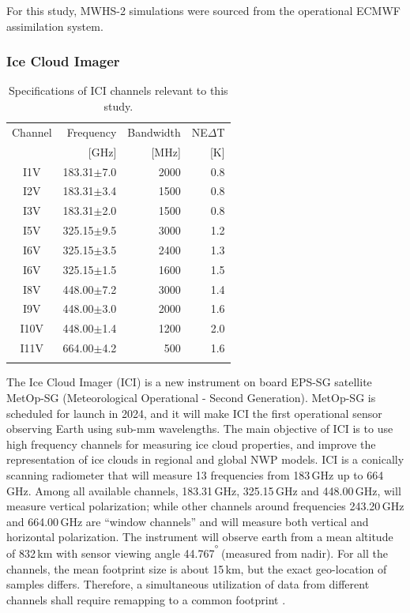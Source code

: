 \documentclass[amt, manuscript]{copernicus}
\begin{document}
For this study, MWHS-2 simulations were sourced from the operational ECMWF assimilation system.

\subsubsection{Ice Cloud Imager}
%
\begin{table}[t]	
	\caption{Specifications of ICI channels relevant to this study.}
	\label{tab:ICI_MWI_channels}
	\begin{tabular}{crrr}
		\tophline
		Channel & Frequency 	& Bandwidth  	&NE$\Delta$T	\\
				& [GHz]			& [MHz]			& [K]			\\
		\middlehline
		I1V&	183.31$\pm$7.0    & 2000 			& 0.8 		\\
		I2V&	183.31$\pm$3.4    & 1500 			& 0.8 		\\
		I3V&	183.31$\pm$2.0    & 1500			& 0.8 		\\
		I5V&	325.15$\pm$9.5    & 3000			& 1.2 		\\
		I6V&	325.15$\pm$3.5    & 2400			& 1.3 		\\
		I6V&	325.15$\pm$1.5    & 1600			& 1.5 		\\
		I8V&	448.00$\pm$7.2    & 3000			& 1.4 		\\
		I9V&	448.00$\pm$3.0    & 2000			& 1.6 		\\
		I10V&	448.00$\pm$1.4    & 1200			& 2.0 		\\
		I11V&	664.00$\pm$4.2    & \phantom{0}500	& 1.6 		\\		
		\bottomhline
	\end{tabular}
	\belowtable{} %
\end{table}

The Ice Cloud Imager (ICI) is a new instrument on board EPS-SG satellite MetOp-SG (Meteorological Operational - Second Generation). MetOp-SG is scheduled for launch in 2024, and it will make ICI the first operational sensor observing Earth using sub-mm wavelengths. The main objective of ICI is to use high frequency channels for measuring ice cloud properties, and improve the representation of ice clouds in regional and global NWP models. ICI is a conically scanning radiometer that will measure 13 frequencies from 183\,GHz up to 664\, GHz.  Among all available channels, 183.31\,GHz, 325.15\,GHz and 448.00\,GHz, will measure vertical polarization;  while other channels around frequencies 243.20\,GHz and 664.00\,GHz are ``window channels'' and will measure both vertical and horizontal polarization. The instrument will observe earth from a mean altitude of 832\,km with sensor viewing angle 44.767$^\unit{^{\degree}}$(measured from nadir). For all the channels, the mean footprint size is about 15\,km, but the exact geo-location of samples differs. Therefore, a simultaneous utilization of data from different channels shall require remapping to a common footprint \citep{eriksson:towar:20}.
\end{document}
